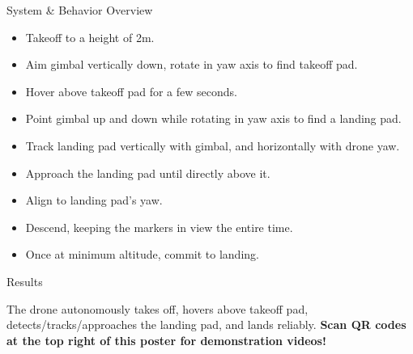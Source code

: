 \documentclass[final, 20pt]{beamer}
\newlength{\colwidth}
\begin{document}
\begin{frame}[t]
\begin{columns}[t]
\begin{column}{\colwidth}
\begin{alertblock}{System \& Behavior Overview}
    \begin{itemize}
      \item Takeoff to a height of 2m.
      \item Aim gimbal vertically down, rotate in yaw axis to find takeoff pad.
      \item Hover above takeoff pad for a few seconds.
      \item Point gimbal up and down while rotating in yaw axis to find a landing pad.
      \item Track landing pad vertically with gimbal, and horizontally with drone yaw.
      \item Approach the landing pad until directly above it.
      \item Align to landing pad's yaw.
      \item Descend, keeping the markers in view the entire time.
      \item Once at minimum altitude, commit to landing.
    \end{itemize}
  \end{alertblock}

  \begin{block}{Results}

    The drone autonomously takes off, hovers above takeoff pad, detects/tracks/approaches the landing pad, and lands reliably.
    \textbf{Scan QR codes at the top right of this poster for demonstration videos!}


\end{block}
\end{column}
\end{columns}
\end{frame}
\end{document}
